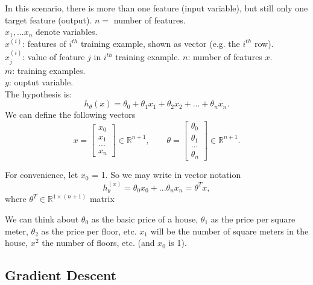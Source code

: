 \documentclass[12pt] {article}
\newcommand{\ind}{{(i)}}
\begin{document}
In this scenario, there is more than one feature (input variable), but still only one target feature (output).
  $n = $ number of features. \\
  $x_1,... x_n$ denote variables.\\
  $x^{(i)}$: features of $i^{th}$ training example, shown as vector 
      (e.g. the $i^{th}$ row).\\
  $x_j^\ind$: value of feature $j$ in $i^{th}$ training example.
  $n$: number of features $x$.\\
  $m$: training examples.\\
  $y$: ouptut variable.\\
  The hypothesis is:
    \begin{equation}
         h_\theta(x) = \theta_0 + \theta_1x_1 + \theta_2x_2 + ... + 
        \theta_nx_n .
    \end{equation}
    We can define the following vectors
    \begin{equation}
      x = \begin{bmatrix} x_0 \\ x_1 \\ ... \\ x_n \end{bmatrix} \in \mathbb{R}^{n+1}, \qquad
        \theta = \begin{bmatrix} \theta_0 \\ \theta_1 \\ ... \\ \theta_n 
        \end{bmatrix} \in \mathbb{R}^{n+1} .
    \end{equation}


  For convenience, let $x_0$ = 1. So we may write in vector notation
  \begin{equation}
     h_\theta^{(x)} = \theta_0x_0 + ...
    \theta_nx_n = \theta^Tx, 
   \end{equation} 
   where $\theta^T \in \mathbb{R}^{1 \times (n+1)}$   matrix 

  We can think about $\theta_0$ as the basic price of a house, $\theta_1$ 
    as the price per square meter, $\theta_2$ as the price per floor, etc. 
    $x_1$ will be the number of square meters in the house, $x^2$ the 
    number of floors, etc. (and $x_0$ is 1).

  \subsection{Gradient Descent}
\end{document}
